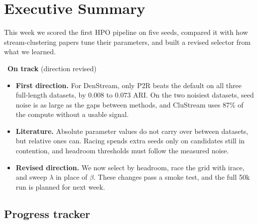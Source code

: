 \section{Executive Summary}
\begin{description}[font=\bfseries\color{accentdark},style=sameline,leftmargin=0pt,labelindent=0pt,itemindent=0pt,labelwidth=0pt,labelsep=0.4em,
                    itemsep=4pt,topsep=2pt]
  \item[Objective -] This week we scored the first HPO pipeline on five seeds, compared it with how stream-clustering papers tune their parameters, and built a revised selector from what we learned.
  \item[Status -] \WIP\ \textbf{On track} (direction revised)
\end{description}

\begin{itemize}[leftmargin=1.2em,itemsep=2pt,topsep=2pt]
  \item \textbf{First direction.} For DenStream, only P2R beats the default on all three full-length datasets, by $0.008$ to $0.073$ ARI. On the two noisiest datasets, seed noise is as large as the gaps between methods, and CluStream uses 87\% of the compute without a usable signal.
  \item \textbf{Literature.} Absolute parameter values do not carry over between datasets, but relative ones can. Racing spends extra seeds only on candidates still in contention, and headroom thresholds must follow the measured noise.
  \item \textbf{Revised direction.} We now select by headroom, race the grid with irace, and sweep $\lambda$ in place of $\beta$. These changes pass a smoke test, and the full 50k run is planned for next week.
\end{itemize}

\subsection*{Progress tracker}

